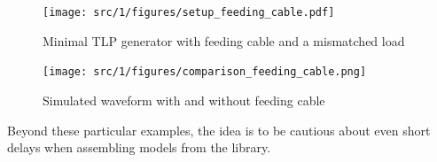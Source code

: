 \begin{figure}[!h]
  \centering
  \texttt{[image: src/1/figures/setup\_feeding\_cable.pdf]}
  \caption{Minimal TLP generator with feeding cable and a mismatched load}
  \label{fig:setup-feeding-cable}
\end{figure}

\begin{figure}[!h]
  \centering
  \texttt{[image: src/1/figures/comparison\_feeding\_cable.png]}
  \caption{Simulated waveform with and without feeding cable}
  \label{fig:comparison-feeding-cable}
\end{figure}

Beyond these particular examples, the idea is to be cautious about even short delays when assembling models from the library.
